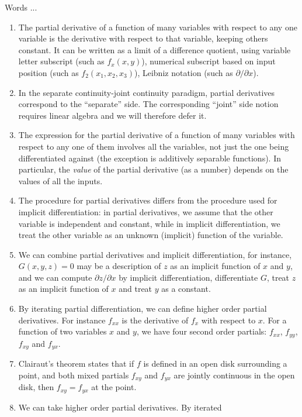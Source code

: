 \documentclass[10pt]{amsart}
\begin{document}
Words ...

\begin{enumerate}
\item The partial derivative of a function of many variables with
  respect to any one variable is the derivative with respect to that
  variable, keeping others constant. It can be written as a limit of a
  difference quotient, using variable letter subscript (such as
  $f_x(x,y)$), numerical subscript based on input position (such as
  $f_2(x_1,x_2,x_3)$), Leibniz notation (such as $\partial/\partial x$).
\item In the separate continuity-joint continuity paradigm, partial
  derivatives correspond to the ``separate'' side. The corresponding
  ``joint'' side notion requires linear algebra and we will therefore
  defer it.
\item The expression for the partial derivative of a function of many
  variables with respect to any one of them involves all the
  variables, not just the one being differentiated against (the
  exception is additively separable functions). In particular, the
  {\em value} of the partial derivative (as a number) depends on the
  values of all the inputs.
\item The procedure for partial derivatives differs from the procedure
  used for implicit differentiation: in partial derivatives, we assume
  that the other variable is independent and constant, while in
  implicit differentiation, we treat the other variable as an unknown
  (implicit) function of the variable.
\item We can combine partial derivatives and implicit differentiation,
  for instance, $G(x,y,z) = 0$ may be a description of $z$ as an
  implicit function of $x$ and $y$, and we can compute $\partial
  z/\partial x$ by implicit differentiation, differentiate $G$, treat
  $z$ as an implicit function of $x$ and treat $y$ as a constant.
\item By iterating partial differentiation, we can define higher order
  partial derivatives. For instance $f_{xx}$ is the derivative of
  $f_x$ with respect to $x$. For a function of two variables $x$ and
  $y$, we have four second order partials: $f_{xx}$, $f_{yy}$,
  $f_{xy}$ and $f_{yx}$. 
\item Clairaut's theorem states that if $f$ is defined in an open disk
  surrounding a point, and both mixed partials $f_{xy}$ and $f_{yx}$
  are jointly continuous in the open disk, then $f_{xy} = f_{yx}$ at
  the point.
\item We can take higher order partial derivatives. By iterated

\end{enumerate}
\end{document}
